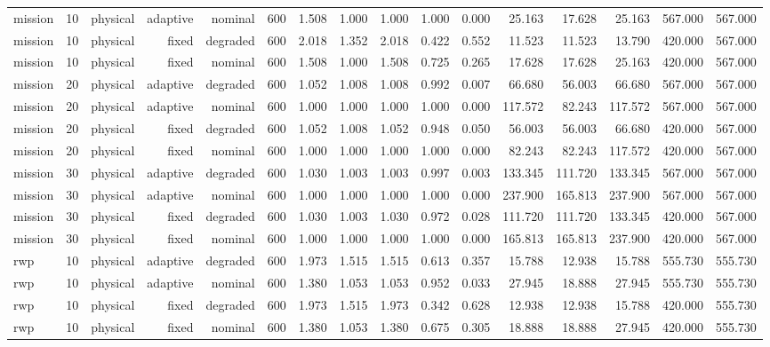 \begin{tabular}{lrrrrrrrrrrrrrrr}
mission & 10 & physical & adaptive & nominal & 600 & 1.508 & 1.000 & 1.000 & 1.000 & 0.000 & 25.163 & 17.628 & 25.163 & 567.000 & 567.000 \\
mission & 10 & physical & fixed & degraded & 600 & 2.018 & 1.352 & 2.018 & 0.422 & 0.552 & 11.523 & 11.523 & 13.790 & 420.000 & 567.000 \\
mission & 10 & physical & fixed & nominal & 600 & 1.508 & 1.000 & 1.508 & 0.725 & 0.265 & 17.628 & 17.628 & 25.163 & 420.000 & 567.000 \\
mission & 20 & physical & adaptive & degraded & 600 & 1.052 & 1.008 & 1.008 & 0.992 & 0.007 & 66.680 & 56.003 & 66.680 & 567.000 & 567.000 \\
mission & 20 & physical & adaptive & nominal & 600 & 1.000 & 1.000 & 1.000 & 1.000 & 0.000 & 117.572 & 82.243 & 117.572 & 567.000 & 567.000 \\
mission & 20 & physical & fixed & degraded & 600 & 1.052 & 1.008 & 1.052 & 0.948 & 0.050 & 56.003 & 56.003 & 66.680 & 420.000 & 567.000 \\
mission & 20 & physical & fixed & nominal & 600 & 1.000 & 1.000 & 1.000 & 1.000 & 0.000 & 82.243 & 82.243 & 117.572 & 420.000 & 567.000 \\
mission & 30 & physical & adaptive & degraded & 600 & 1.030 & 1.003 & 1.003 & 0.997 & 0.003 & 133.345 & 111.720 & 133.345 & 567.000 & 567.000 \\
mission & 30 & physical & adaptive & nominal & 600 & 1.000 & 1.000 & 1.000 & 1.000 & 0.000 & 237.900 & 165.813 & 237.900 & 567.000 & 567.000 \\
mission & 30 & physical & fixed & degraded & 600 & 1.030 & 1.003 & 1.030 & 0.972 & 0.028 & 111.720 & 111.720 & 133.345 & 420.000 & 567.000 \\
mission & 30 & physical & fixed & nominal & 600 & 1.000 & 1.000 & 1.000 & 1.000 & 0.000 & 165.813 & 165.813 & 237.900 & 420.000 & 567.000 \\
rwp & 10 & physical & adaptive & degraded & 600 & 1.973 & 1.515 & 1.515 & 0.613 & 0.357 & 15.788 & 12.938 & 15.788 & 555.730 & 555.730 \\
rwp & 10 & physical & adaptive & nominal & 600 & 1.380 & 1.053 & 1.053 & 0.952 & 0.033 & 27.945 & 18.888 & 27.945 & 555.730 & 555.730 \\
rwp & 10 & physical & fixed & degraded & 600 & 1.973 & 1.515 & 1.973 & 0.342 & 0.628 & 12.938 & 12.938 & 15.788 & 420.000 & 555.730 \\
rwp & 10 & physical & fixed & nominal & 600 & 1.380 & 1.053 & 1.380 & 0.675 & 0.305 & 18.888 & 18.888 & 27.945 & 420.000 & 555.730 \\

\end{tabular}

